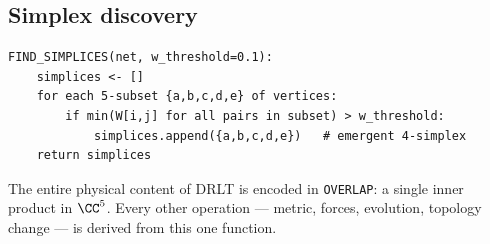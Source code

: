 \subsection{Simplex discovery}

\begin{verbatim}
FIND_SIMPLICES(net, w_threshold=0.1):
    simplices <- []
    for each 5-subset {a,b,c,d,e} of vertices:
        if min(W[i,j] for all pairs in subset) > w_threshold:
            simplices.append({a,b,c,d,e})   # emergent 4-simplex
    return simplices
\end{verbatim}

\begin{remark}
The entire physical content of DRLT is encoded in \texttt{OVERLAP}: a single inner product in $\CC^5$. Every other operation --- metric, forces, evolution, topology change --- is derived from this one function.
\end{remark}
